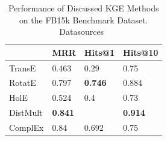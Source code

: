 \begin{table}[!ht]
    \centering

    \begin{tabular}{|l|l|l|l|}
        \hline
         & MRR            & Hits@1                       & Hits@10               \\ \hline
TransE   & 0.463          & 0.29                         & 0.75                  \\ \hline
RotatE   & 0.797          & \textbf{0.746}               & 0.884                 \\ \hline
HolE     & 0.524          & 0.4                          & 0.73                  \\ \hline
DistMult & \textbf{0.841} &                              & \textbf{0.914}        \\ \hline
ComplEx  & 0.84           & 0.692 &  0.75                                        \\ \hline
\end{tabular}
\caption{Performance of Discussed KGE Methods on the FB15k Benchmark Dataset. Datasources~\cite{paperswithcode2024fb15k, HolE}}
\label{tab:kge-perf-comp}
\end{table}
